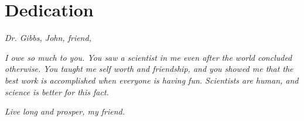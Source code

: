 \chapter*{Dedication}

\vspace{5em}

\textit{Dr. Gibbs, John, friend,}
\vspace{1em}

\textit{I owe so much to you. You saw a scientist in me even after the world concluded otherwise. You taught me self worth and friendship, and you showed me that the best work is accomplished when everyone is having fun. Scientists are human, and science is better for this fact.}%
\vspace{1em}

\textit{Live long and prosper, my friend.}

